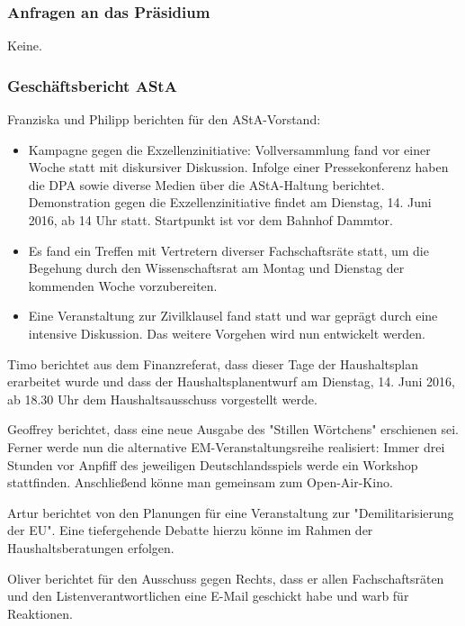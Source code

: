 \documentclass[ngerman,headheight=70pt]{scrartcl}
\begin{document}
    \subsubsection{Anfragen an das Präsidium}

    Keine.

    \subsubsection{Geschäftsbericht AStA}

    Franziska und Philipp berichten für den AStA-Vorstand:
    \begin{itemize}
        \item Kampagne gegen die Exzellenzinitiative: Vollversammlung fand vor
        einer Woche statt mit diskursiver Diskussion. Infolge einer Pressekonferenz
        haben die DPA sowie diverse Medien über die AStA-Haltung berichtet.
        Demonstration gegen die Exzellenzinitiative findet am Dienstag,
        14. Juni 2016, ab 14 Uhr statt. Startpunkt ist vor dem Bahnhof Dammtor.
        \item Es fand ein Treffen mit Vertretern diverser Fachschaftsräte statt,
        um die Begehung durch den Wissenschaftsrat am Montag und Dienstag der
        kommenden Woche vorzubereiten.
        \item Eine Veranstaltung zur Zivilklausel fand statt und war geprägt
        durch eine intensive Diskussion. Das weitere Vorgehen wird nun
        entwickelt werden.
    \end{itemize}

    Timo berichtet aus dem Finanzreferat, dass dieser Tage der Haushaltsplan
    erarbeitet wurde und dass der Haushaltsplanentwurf am Dienstag, 14. Juni 2016,
    ab 18.30 Uhr dem Haushaltsausschuss vorgestellt werde.

    Geoffrey berichtet, dass eine neue Ausgabe des "Stillen Wörtchens" erschienen
    sei. Ferner werde nun die alternative EM-Veranstaltungsreihe realisiert: Immer
    drei Stunden vor Anpfiff des jeweiligen Deutschlandsspiels werde ein Workshop
    stattfinden. Anschließend könne man gemeinsam zum Open-Air-Kino.

    Artur berichtet von den Planungen für eine Veranstaltung zur "Demilitarisierung
    der EU". Eine tiefergehende Debatte hierzu könne im Rahmen der
    Haushaltsberatungen erfolgen.

    Oliver berichtet für den Ausschuss gegen Rechts, dass er allen Fachschaftsräten
    und den Listenverantwortlichen eine E-Mail geschickt habe und warb für
    Reaktionen.
\end{document}
